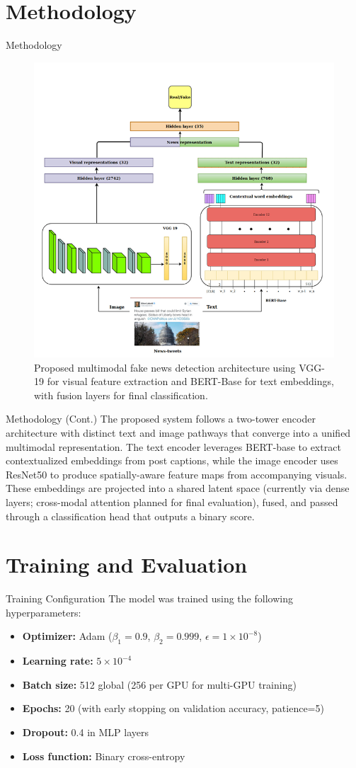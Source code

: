 \documentclass[xcolor=dvipsnames,aspectratio=169]{beamer}
\begin{document}
\section{Methodology}
\begin{frame}{Methodology}
\begin{figure}
    \centering
    \includegraphics[width=0.4\linewidth]{Spot fake design.png}
    \caption{Proposed multimodal fake news detection architecture using VGG-19 for visual feature extraction and BERT-Base for text embeddings, with fusion layers for final classification.}
    \label{fig:methodology_architecture}
\end{figure}
\end{frame}

\begin{frame}{Methodology (Cont.)}
    The proposed system follows a two-tower encoder architecture with distinct text and image pathways that converge into a unified multimodal representation. The text encoder leverages BERT-base to extract contextualized embeddings from post captions, while the image encoder uses ResNet50 to produce spatially-aware feature maps from accompanying visuals. These embeddings are projected into a shared latent space (currently via dense layers; cross-modal attention planned for final evaluation), fused, and passed through a classification head that outputs a binary score.
\end{frame}

\section{Training and Evaluation}

\begin{frame}{Training Configuration}
The model was trained using the following hyperparameters:
\begin{itemize}
    \item \textbf{Optimizer:} Adam ($\beta_1=0.9$, $\beta_2=0.999$, $\epsilon=1\times10^{-8}$)
    \item \textbf{Learning rate:} $5\times10^{-4}$
    \item \textbf{Batch size:} 512 global (256 per GPU for multi-GPU training)
    \item \textbf{Epochs:} 20 (with early stopping on validation accuracy, patience=5)
    \item \textbf{Dropout:} 0.4 in MLP layers
    \item \textbf{Loss function:} Binary cross-entropy
\end{itemize}
\end{frame}
\end{document}
